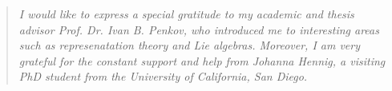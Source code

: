 \documentclass[10pt,a4paper]{article}
\begin{document}


\renewcommand{\abstractname}{\begin{Large}Acknowledgements\end{Large}}
\begin{abstract}
\begin{large}
\textit{
I would like to express a special gratitude to my academic and thesis advisor Prof. Dr. Ivan B. Penkov, who introduced me to interesting areas such as represenatation theory and Lie algebras.   Moreover, I am very grateful for the constant support and help from Johanna Hennig, a visiting PhD student from  the University of California, San Diego.}
\end{large}
\end{abstract}

\thispagestyle{empty}
\newpage
\tableofcontents{}
\thispagestyle{empty}
\newpage
\pagestyle{headings}
\newpage
\setcounter{page}{1}


\newpage
\medskip
 
\printbibliography
\end{document}

